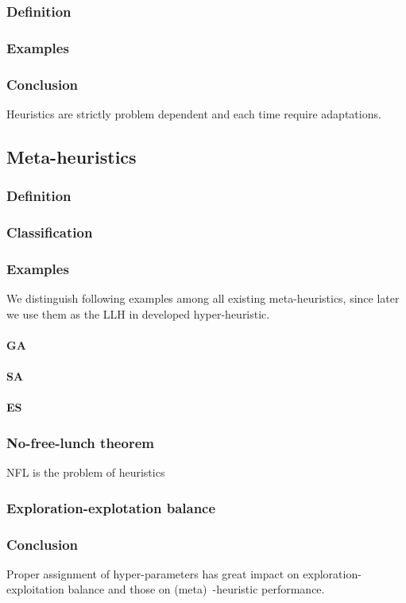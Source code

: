 \subsubsection{Definition}
\subsubsection{Examples}
\subsubsection{Conclusion}
Heuristics are strictly problem dependent and each time require adaptations.

\subsection{Meta-heuristics}
\subsubsection{Definition}
\subsubsection{Classification}
\subsubsection{Examples}
We distinguish following examples among all existing meta-heuristics, since later we use them as the LLH in developed hyper-heuristic.
\paragraph{GA}
\paragraph{SA}
\paragraph{ES}
\subsubsection{No-free-lunch theorem}
NFL is the problem of heuristics\cite{wolpert1997no}
\subsubsection{Exploration-explotation balance}
\subsubsection{Conclusion} 
Proper assignment of hyper-parameters has great impact on exploration-exploitation balance and those on (meta)~-heuristic performance. 

